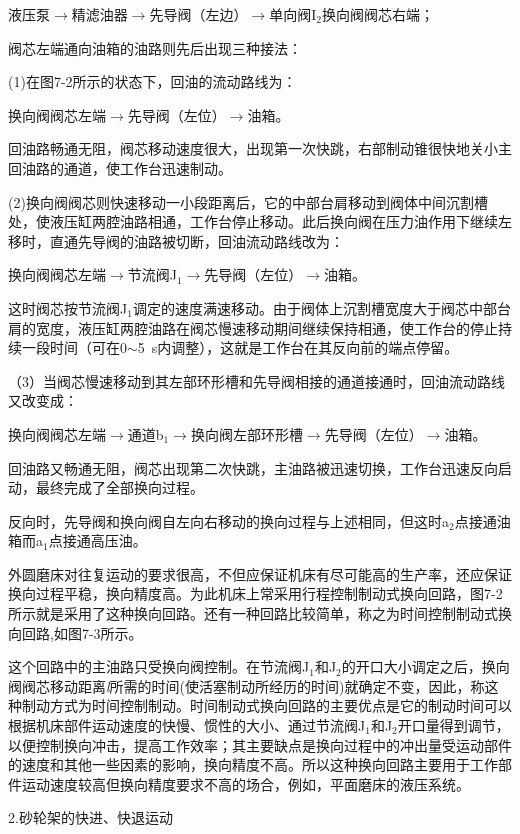 液压泵$\rightarrow$精滤油器$\rightarrow$先导阀（左边）$\rightarrow$单向阀I$_2$换向阀阀芯右端；

阀芯左端通向油箱的油路则先后出现三种接法：

(1)在图7-2所示的状态下，回油的流动路线为：

换向阀阀芯左端$\rightarrow$先导阀（左位）$\rightarrow$油箱。

回油路畅通无阻，阀芯移动速度很大，出现第一次快跳，右部制动锥很快地关小主回油路的通道，使工作台迅速制动。

(2)换向阀阀芯则快速移动一小段距离后，它的中部台肩移动到阀体中间沉割槽处，使液压缸两腔油路相通，工作台停止移动。此后换向阀在压力油作用下继续左移时，直通先导阀的油路被切断，回油流动路线改为：

换向阀阀芯左端$\rightarrow$节流阀J$_1$$\rightarrow$先导阀（左位）$\rightarrow$油箱。

这时阀芯按节流阀J$_1$调定的速度满速移动。由于阀体上沉割槽宽度大于阀芯中部台肩的宽度，液压缸两腔油路在阀芯慢速移动期间继续保持相通，使工作台的停止持续一段时间（可在0$\sim$5\ s内调整），这就是工作台在其反向前的端点停留。

（3）当阀芯慢速移动到其左部环形槽和先导阀相接的通道接通时，回油流动路线又改变成：

换向阀阀芯左端$\rightarrow$通道b$_1$$\rightarrow$换向阀左部环形槽$\rightarrow$先导阀（左位）$\rightarrow$油箱。

回油路又畅通无阻，阀芯出现第二次快跳，主油路被迅速切换，工作台迅速反向启动，最终完成了全部换向过程。

反向时，先导阀和换向阀自左向右移动的换向过程与上述相同，但这时a$_2$点接通油箱而a$_1$点接通高压油。

外圆磨床对往复运动的要求很高，不但应保证机床有尽可能高的生产率，还应保证换向过程平稳，换向精度高。为此机床上常采用行程控制制动式换向回路，图7-2所示就是采用了这种换向回路。还有一种回路比较简单，称之为时间控制制动式换向回路,如图7-3所示。

这个回路中的主油路只受换向阀控制。在节流阀J$_1$和J$_2$的开口大小调定之后，换向阀阀芯移动距离\emph{l}所需的时间(使活塞制动所经历的时间)就确定不变，因此，称这种制动方式为时间控制制动。时间制动式换向回路的主要优点是它的制动时间可以根据机床部件运动速度的快慢、惯性的大小、通过节流阀J$_1$和J$_2$开口量得到调节，以便控制换向冲击，提高工作效率；其主要缺点是换向过程中的冲出量受运动部件的速度和其他一些因素的影响，换向精度不高。所以这种换向回路主要用于工作部件运动速度较高但换向精度要求不高的场合，例如，平面磨床的液压系统。

2.砂轮架的快进、快退运动

